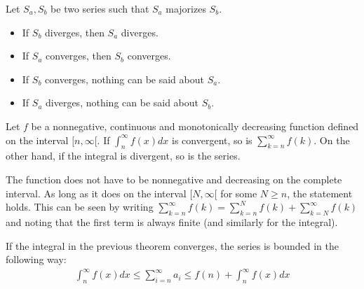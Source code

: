 
    \begin{method}
        Let $S_a,S_b$ be two series such that $S_a$ majorizes $S_b$.
        \begin{itemize}
            \item If $S_b$ diverges, then $S_a$ diverges.
            \item If $S_a$ converges, then $S_b$ converges.
            \item If $S_b$ converges, nothing can be said about $S_a$.
            \item If $S_a$ diverges, nothing can be said about $S_b$.
        \end{itemize}
    \end{method}

    \begin{method}
        Let $f$ be a nonnegative, continuous and monotonically decreasing function defined on the interval $[n,\infty[$. If $\int_n^\infty f(x)dx$ is convergent, so is $\sum_{k=n}^\infty f(k)$. On the other hand, if the integral is divergent, so is the series.
    \end{method}
    \begin{remark}
        The function does not have to be nonnegative and decreasing on the complete interval. As long as it does on the interval $[N,\infty[$ for some $N\geq n$, the statement holds. This can be seen by writing $\sum_{k=n}^\infty f(k) = \sum_{k=n}^Nf(k) + \sum_{k=N}^\infty f(k)$ and noting that the first term is always finite (and similarly for the integral).
    \end{remark}

    \begin{property}
        If the integral in the previous theorem converges, the series is bounded in the following way:
        \begin{gather}
            \int_n^\infty f(x)dx \leq \sum_{i=n}^\infty a_i \leq f(n) + \int_n^\infty f(x)dx
        \end{gather}
    \end{property}

